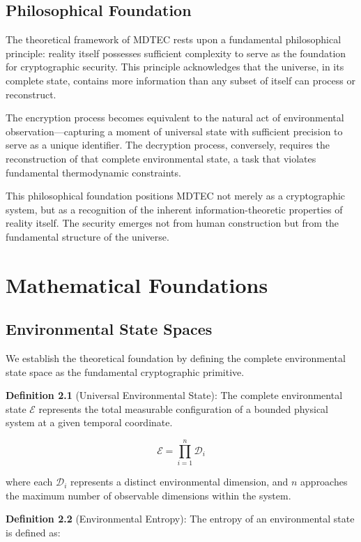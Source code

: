 \documentclass[12pt]{article}
\begin{document}
\subsection{Philosophical Foundation}

The theoretical framework of MDTEC rests upon a fundamental philosophical principle: reality itself possesses sufficient complexity to serve as the foundation for cryptographic security. This principle acknowledges that the universe, in its complete state, contains more information than any subset of itself can process or reconstruct.

The encryption process becomes equivalent to the natural act of environmental observation—capturing a moment of universal state with sufficient precision to serve as a unique identifier. The decryption process, conversely, requires the reconstruction of that complete environmental state, a task that violates fundamental thermodynamic constraints.

This philosophical foundation positions MDTEC not merely as a cryptographic system, but as a recognition of the inherent information-theoretic properties of reality itself. The security emerges not from human construction but from the fundamental structure of the universe.

\section{Mathematical Foundations}

\subsection{Environmental State Spaces}

We establish the theoretical foundation by defining the complete environmental state space as the fundamental cryptographic primitive.

\textbf{Definition 2.1} (Universal Environmental State): The complete environmental state $\mathcal{E}$ represents the total measurable configuration of a bounded physical system at a given temporal coordinate.

$$\mathcal{E} = \prod_{i=1}^{n} \mathcal{D}_i$$

where each $\mathcal{D}_i$ represents a distinct environmental dimension, and $n$ approaches the maximum number of observable dimensions within the system.

\textbf{Definition 2.2} (Environmental Entropy): The entropy of an environmental state is defined as:
\end{document}
